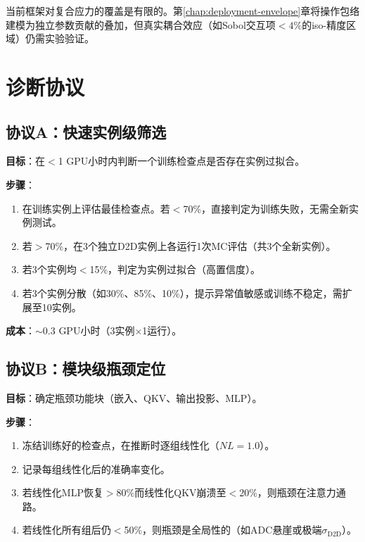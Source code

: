 当前框架对复合应力的覆盖是有限的。第\ref{chap:deployment-envelope}章将操作包络建模为独立参数贡献的叠加，但真实耦合效应（如Sobol交互项$<4\%$的iso-精度区域）仍需实验验证。


\section{诊断协议}
\label{sec:diagnostic_protocols}

\subsection{协议A：快速实例级筛选}
\label{subsec:protocol_a}

\textbf{目标}：在$<$1 GPU小时内判断一个训练检查点是否存在实例过拟合。

\textbf{步骤}：
\begin{enumerate}
    \item 在训练实例上评估最佳检查点。若$<$70\%，直接判定为训练失败，无需全新实例测试。
    \item 若$>$70\%，在3个独立D2D实例上各运行1次MC评估（共3个全新实例）。
    \item 若3个实例均$<$15\%，判定为实例过拟合（高置信度）。
    \item 若3个实例分散（如30\%、85\%、10\%），提示异常值敏感或训练不稳定，需扩展至10实例。
\end{enumerate}

\textbf{成本}：$\sim$0.3 GPU小时（3实例$\times$1运行）。

\subsection{协议B：模块级瓶颈定位}
\label{subsec:protocol_b}

\textbf{目标}：确定瓶颈功能块（嵌入、QKV、输出投影、MLP）。

\textbf{步骤}：
\begin{enumerate}
    \item 冻结训练好的检查点，在推断时逐组线性化（$NL=1.0$）。
    \item 记录每组线性化后的准确率变化。
    \item 若线性化MLP恢复$>$80\%而线性化QKV崩溃至$<$20\%，则瓶颈在注意力通路。
    \item 若线性化所有组后仍$<$50\%，则瓶颈是全局性的（如ADC悬崖或极端$\sigma_{\mathrm{D2D}}$）。
\end{enumerate}

